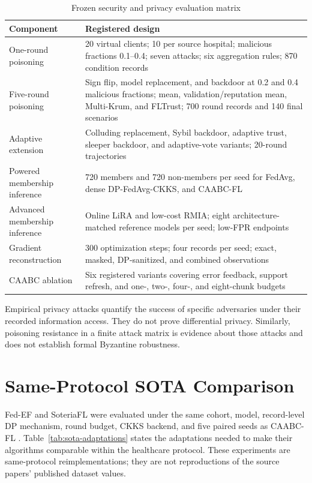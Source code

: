 \begin{table}[htbp]
    \centering
    \caption{Frozen security and privacy evaluation matrix}
    \label{tab:security-protocol-matrix}
    \begin{tabularx}{\textwidth}{@{}p{3.1cm}X@{}}
        \toprule
        Component & Registered design \\
        \midrule
        One-round poisoning & 20 virtual clients; 10 per source hospital; malicious fractions 0.1--0.4; seven attacks; six aggregation rules; 870 condition records \\
        Five-round poisoning & Sign flip, model replacement, and backdoor at 0.2 and 0.4 malicious fractions; mean, validation/reputation mean, Multi-Krum, and FLTrust; 700 round records and 140 final scenarios \\
        Adaptive extension & Colluding replacement, Sybil backdoor, adaptive trust, sleeper backdoor, and adaptive-vote variants; 20-round trajectories \\
        Powered membership inference & 720 members and 720 non-members per seed for FedAvg, dense DP-FedAvg-CKKS, and CAABC-FL \\
        Advanced membership inference & Online LiRA and low-cost RMIA; eight architecture-matched reference models per seed; low-FPR endpoints \\
        Gradient reconstruction & 300 optimization steps; four records per seed; exact, masked, DP-sanitized, and combined observations \\
        CAABC ablation & Six registered variants covering error feedback, support refresh, and one-, two-, four-, and eight-chunk budgets \\
        \bottomrule
    \end{tabularx}
\end{table}

Empirical privacy attacks quantify the success of specific adversaries under their recorded information access. They do not prove differential privacy. Similarly, poisoning resistance in a finite attack matrix is evidence about those attacks and does not establish formal Byzantine robustness.

\section{Same-Protocol SOTA Comparison}
\label{appsec:sota-protocol}

Fed-EF and SoteriaFL were evaluated under the same cohort, model, record-level DP mechanism, round budget, CKKS backend, and five paired seeds as CAABC-FL \cite{li2023fedef,li2022soteriafl}. Table~\ref{tab:sota-adaptations} states the adaptations needed to make their algorithms comparable within the healthcare protocol. These experiments are same-protocol reimplementations; they are not reproductions of the source papers' published dataset values.

